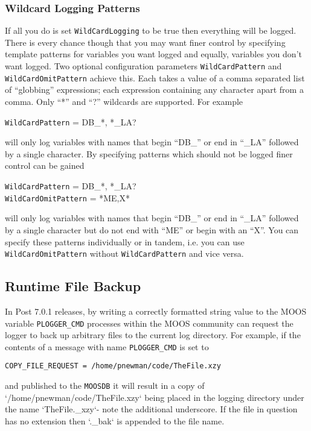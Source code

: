 \documentclass[a4paper,10pt]{article}
\newcommand{\Code}[1]{\texttt{#1} }
\newcommand{\code}[1]{\Code{#1} }
\newcommand{\DB}   {\code{{MOOSDB}}}
\begin{document}
\subsubsection{Wildcard Logging Patterns}

If all you do is set \code{WildCardLogging} to be true then everything will be logged. There is every chance though that you may want finer control by specifying template patterns for variables you want logged and equally, variables you don't want logged. Two optional configuration parameters \code{WildCardPattern} and \code{WildCardOmitPattern} achieve this. Each takes a value of a comma separated list of  ``globbing'' expressions; each expression containing any character apart from a comma. Only ``*'' and ``?'' wildcards are supported. For example

\begin{center}
\code{WildCardPattern} =  DB\_*, *\_LA?
\end{center}

will only log variables with names that begin ``DB\_'' or end in ``\_LA'' followed by a single character. By specifying patterns which should not be logged finer control can be gained

\begin{center}
\code{WildCardPattern} =  DB\_*, *\_LA? \\
\code{WildCardOmitPattern} =  *ME,X*
\end{center}

will only log variables with names that  begin ``DB\_'' or end in ``\_LA'' followed by a single character but do not end with ``ME'' or begin with an ``X''. You can specify these patterns individually or  in tandem, i.e. you can use \code{WildCardOmitPattern}  without \code{WildCardPattern}  and vice versa.


\subsection{Runtime File Backup}
In Post 7.0.1 releases, by writing a correctly formatted string value to the MOOS variable \code{PLOGGER\_CMD} processes within the MOOS community can request the logger to back up arbitrary files to the current log directory. For example, if the contents of a message with name \code{PLOGGER\_CMD} is set to
\begin{center}
\code{COPY\_FILE\_REQUEST = /home/pnewman/code/TheFile.xzy}
\end{center}
 and published to the \DB  it will result in a copy of `/home/pnewman/code/TheFile.xzy` being placed in the logging directory under the name `TheFile.\_xzy`- note the additional underscore. If the file in question has no extension then `.\_bak` is appended to the file name.
\end{document}
